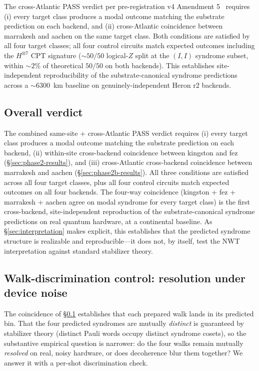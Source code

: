 \documentclass[11pt]{article}
\begin{document}
The cross-Atlantic PASS verdict per pre-registration v4 Amendment 5~\cite{Exp12Prereg} requires (i) every target class produces a modal outcome matching the substrate prediction on each backend, and (ii) cross-Atlantic coincidence between marrakesh and aachen on the same target class.  Both conditions are satisfied by all four target classes; all four control circuits match expected outcomes including the $H^{\otimes 7}$ CPT signature ($\sim 50/50$ logical-$Z$ split at the $(I, I)$ syndrome subset, within $\sim 2\%$ of theoretical $50/50$ on both backends).  This establishes site-independent reproducibility of the substrate-canonical syndrome predictions across a $\sim 6300$~km baseline on genuinely-independent Heron r2 backends.

\subsection{Overall verdict}
\label{sec:phase2-verdict}

The combined same-site + cross-Atlantic PASS verdict requires (i) every target class produces a modal outcome matching the substrate prediction on each backend, (ii) within-site cross-backend coincidence between kingston and fez (\S\ref{sec:phase2-results}), and (iii) cross-Atlantic cross-backend coincidence between marrakesh and aachen (\S\ref{sec:phase2b-results}).  All three conditions are satisfied across all four target classes, plus all four control circuits match expected outcomes on all four backends.  The four-way coincidence (kingston + fez + marrakesh + aachen agree on modal syndrome for every target class) is the first cross-backend, site-independent reproduction of the substrate-canonical syndrome predictions on real quantum hardware, at a continental baseline.  As \S\ref{sec:interpretation} makes explicit, this establishes that the predicted syndrome structure is realizable and reproducible---it does not, by itself, test the NWT interpretation against standard stabilizer theory.

\subsection{Walk-discrimination control: resolution under device noise}
\label{sec:scrambled-control}

The coincidence of \S\ref{sec:phase2-verdict} establishes that each prepared walk lands in its predicted bin.  That the four predicted syndromes are mutually \emph{distinct} is guaranteed by stabilizer theory (distinct Pauli words occupy distinct syndrome cosets), so the substantive empirical question is narrower: do the four walks remain mutually \emph{resolved} on real, noisy hardware, or does decoherence blur them together?  We answer it with a per-shot discrimination check.
\end{document}
